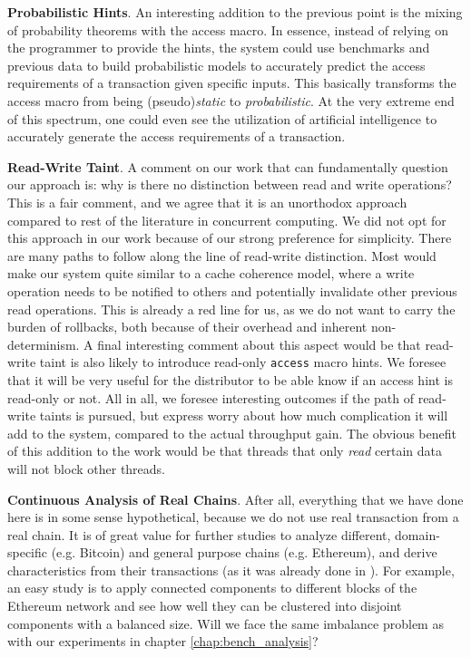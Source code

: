 \textbf{Probabilistic Hints}. An interesting addition to the previous point is the mixing of
probability theorems with the access macro. In essence, instead of relying on the programmer to
provide the hints, the system could use benchmarks and previous data to build probabilistic models
to accurately predict the access requirements of a transaction given specific inputs.  This
basically transforms the access macro from being (pseudo)\textit{static} to \textit{probabilistic}.
At the very extreme end of this spectrum, one could even see the utilization of artificial
intelligence to accurately generate the access requirements of a transaction.

\textbf{Read-Write Taint}. A comment on our work that can fundamentally question our approach is:
why is there no distinction between read and write operations? This is a fair comment, and we agree
that it is an unorthodox approach compared to rest of the literature in concurrent computing. We did
not opt for this approach in our work because of our strong preference for simplicity. There are
many paths to follow along the line of read-write distinction. Most would make our system quite
similar to a cache coherence model, where a write operation needs to be notified to others and
potentially invalidate other previous read operations. This is already a red line for us, as we
do not want to carry the burden of rollbacks, both because of their overhead and inherent
non-determinism. A final interesting comment about this aspect would be that read-write taint is also
likely to introduce read-only \texttt{access} macro hints. We foresee that it will be very useful
for the distributor to be able know if an access hint is read-only or not. All in all, we foresee
interesting outcomes if the path of read-write taints is pursued, but express worry about how much
complication it will add to the system, compared to the actual throughput gain. The obvious benefit of
this addition to the work would be that threads that only \textit{read} certain data will not block
other threads.

\textbf{Continuous Analysis of Real Chains}. After all, everything that we have done here is in some
sense hypothetical, because we do not use real transaction from a real chain. It is of great value
for further studies to analyze different, domain-specific (e.g. Bitcoin) and general purpose chains
(e.g. Ethereum), and derive characteristics from their transactions (as it was already done in
\cite{saraphEmpiricalStudySpeculative2019}). For example, an easy study is to apply connected
components to different blocks of the Ethereum network and see how well they can be clustered into
disjoint components with a balanced size. Will we face the same imbalance problem as with our experiments in chapter
\ref{chap:bench_analysis}?

